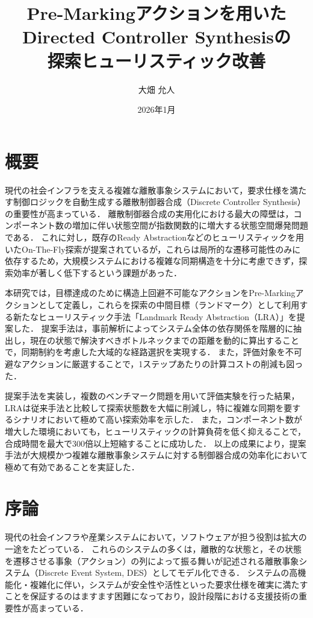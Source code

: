\documentclass[a4paper,11pt,oneside,openany,report,dvipdfmx]{jsbook}
\title{Pre-Markingアクションを用いた\\Directed Controller Synthesisの\\探索ヒューリスティック改善}
\author{大畑 允人}
\affiliation{%
	東京科学大学\\
	情報理工学院\\
	情報工学コース
}
\date{2026年1月}
\begin{document}
\frontmatter

\maketitle

\chapter{概要}

現代の社会インフラを支える複雑な離散事象システムにおいて，要求仕様を満たす制御ロジックを自動生成する離散制御器合成（Discrete Controller Synthesis）の重要性が高まっている．
離散制御器合成の実用化における最大の障壁は，コンポーネント数の増加に伴い状態空間が指数関数的に増大する状態空間爆発問題である．
これに対し，既存のReady Abstractionなどのヒューリスティックを用いたOn-The-Fly探索が提案されているが，これらは局所的な遷移可能性のみに依存するため，大規模システムにおける複雑な同期構造を十分に考慮できず，探索効率が著しく低下するという課題があった．

本研究では，目標達成のために構造上回避不可能なアクションをPre-Markingアクションとして定義し，これらを探索の中間目標（ランドマーク）として利用する新たなヒューリスティック手法「Landmark Ready Abstraction（LRA）」を提案した．
提案手法は，事前解析によってシステム全体の依存関係を階層的に抽出し，現在の状態で解決すべきボトルネックまでの距離を動的に算出することで，同期制約を考慮した大域的な経路選択を実現する．
また，評価対象を不可避なアクションに厳選することで，1ステップあたりの計算コストの削減も図った．

提案手法を実装し，複数のベンチマーク問題を用いて評価実験を行った結果，LRAは従来手法と比較して探索状態数を大幅に削減し，特に複雑な同期を要するシナリオにおいて極めて高い探索効率を示した．
また，コンポーネント数が増大した環境においても，ヒューリスティックの計算負荷を低く抑えることで，合成時間を最大で300倍以上短縮することに成功した．
以上の成果により，提案手法が大規模かつ複雑な離散事象システムに対する制御器合成の効率化において極めて有効であることを実証した．

\tableofcontents
\listoffigures
\listoftables

\mainmatter

\chapter{序論}

現代の社会インフラや産業システムにおいて，ソフトウェアが担う役割は拡大の一途をたどっている．
これらのシステムの多くは，離散的な状態と，その状態を遷移させる事象（アクション）の列によって振る舞いが記述される離散事象システム（Discrete Event System, DES）としてモデル化できる．
システムの高機能化・複雑化に伴い，システムが安全性や活性といった要求仕様を確実に満たすことを保証するのはますます困難になっており，設計段階における支援技術の重要性が高まっている．
\end{document}
